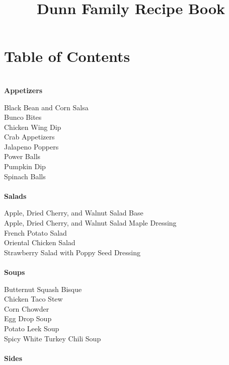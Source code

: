 \documentclass[11pt, twoside, openany]{book}
\title{ \LARGE \textbf{Dunn Family Recipe Book}}
\begin{document}
\maketitle
\section*{Table of Contents}
{~\vspace{2mm}\\ \Large \textbf{Appetizers}}\hfill\textbf{\pageref{appetizers}}

Black Bean and Corn Salsa\hrulefill\pageref{black-bean-and-corn-salsa}\\
Bunco Bites\hrulefill\pageref{bunco-bites}\\
Chicken Wing Dip\hrulefill\pageref{chicken-wing-dip}\\
Crab Appetizers\hrulefill\pageref{crab-appetizers}\\
Jalapeno Poppers\hrulefill\pageref{jalapeno-poppers}\\
Power Balls\hrulefill\pageref{power-balls}\\
Pumpkin Dip\hrulefill\pageref{pumpkin-dip}\\
Spinach Balls\hrulefill\pageref{spinach-balls}\\
{~\vspace{2mm}\\ \Large \textbf{Salads}}\hfill\textbf{\pageref{salads}}

Apple, Dried Cherry, and Walnut Salad Base\hrulefill\pageref{apple,-dried-cherry,-and-walnut-salad-base}\\
Apple, Dried Cherry, and Walnut Salad Maple Dressing\hrulefill\pageref{apple,-dried-cherry,-and-walnut-salad-maple-dressing}\\
French Potato Salad\hrulefill\pageref{french-potato-salad}\\
Oriental Chicken Salad\hrulefill\pageref{oriental-chicken-salad}\\
Strawberry Salad with Poppy Seed Dressing\hrulefill\pageref{strawberry-salad-with-poppy-seed-dressing}\\
{~\vspace{2mm}\\ \Large \textbf{Soups}}\hfill\textbf{\pageref{soups}}

Butternut Squash Bisque\hrulefill\pageref{butternut-squash-bisque}\\
Chicken Taco Stew\hrulefill\pageref{chicken-taco-stew}\\
Corn Chowder\hrulefill\pageref{corn-chowder}\\
Egg Drop Soup\hrulefill\pageref{egg-drop-soup}\\
Potato Leek Soup\hrulefill\pageref{potato-leek-soup}\\
Spicy White Turkey Chili Soup\hrulefill\pageref{spicy-white-turkey-chili-soup}\\
{~\vspace{2mm}\\ \Large \textbf{Sides}}\hfill\textbf{\pageref{sides}}
\end{document}
